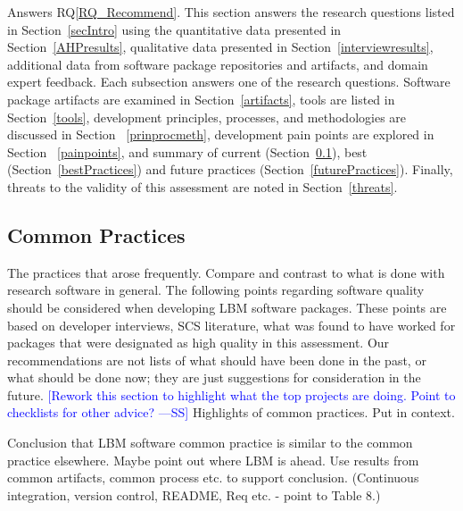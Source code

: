 \documentclass[final, 3p, times, authoryear]{elsarticle}
\newcommand{\authornote}[3]{\textcolor{#1}{[#3 ---#2]}}
\newcommand{\authornote}[3]{}
\newcommand{\wss}[1]{\authornote{blue}{SS}{#1}} %
\newcommand{\rqref}[1]{RQ\ref{#1}}
\begin{document}
Answers \rqref{RQ_Recommend}.  This section answers the research questions
listed in Section~\ref{secIntro} using the quantitative data presented in
Section~\ref{AHPresults}, qualitative data presented in
Section~\ref{interviewresults}, additional data from software package
repositories and artifacts, and domain expert feedback. Each subsection answers
one of the research questions. Software package artifacts are examined in
Section~\ref{artifacts}, tools are listed in Section~\ref{tools}, development
principles, processes, and methodologies are discussed in Section
~\ref{prinprocmeth}, development pain points are explored in Section
~\ref{painpoints}, and summary of current (Section~\ref{currentPractices}), best
(Section~\ref{bestPractices}) and future practices
(Section~\ref{futurePractices}). Finally, threats to the validity of this
assessment are noted in Section~\ref{threats}.

\subsection{Common Practices} \label{currentPractices}

The practices that arose frequently.  Compare and contrast to what is done with
research software in general.  The following points regarding software quality
should be considered when developing LBM software packages. These points are
based on developer interviews, SCS literature, what was found to have worked for
packages that were designated as high quality in this assessment.  Our
recommendations are not lists of what should have been done in the past, or what
should be done now; they are just suggestions for consideration in the future.
\wss{Rework this section to highlight what the top projects are doing.  Point to
checklists for other advice?}  Highlights of common practices.  Put in context.

Conclusion that LBM software common practice is similar to the common practice
elsewhere.  Maybe point out where LBM is ahead.  Use results from common
artifacts, common process etc. to support conclusion.  (Continuous integration,
version control, README, Req etc. - point to Table 8.)
\end{document}
